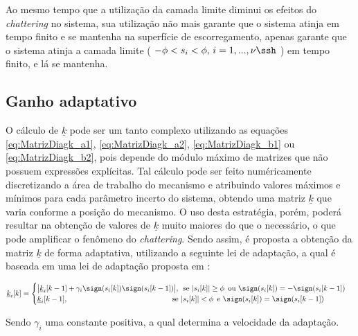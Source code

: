 \documentclass[]{politex}
\begin{document}
Ao mesmo tempo que a utilização da camada limite diminui os efeitos do \emph{chattering} no sistema, sua utilização não mais garante que o sistema atinja em tempo finito e se mantenha na superfície de escorregamento, apenas garante que o sistema atinja a camada limite ( $-\phi < s_i < \phi, \, i = 1,...,\nu\ssh $ ) em tempo finito, e lá se mantenha. 


\subsection{Ganho adaptativo}

O cálculo de $\underline{k}$ pode ser um tanto complexo utilizando as equações \eqref{eq:MatrizDiagk_a1}, \eqref{eq:MatrizDiagk_a2}, \eqref{eq:MatrizDiagk_b1} ou \eqref{eq:MatrizDiagk_b2}, pois depende do módulo máximo de matrizes que não possuem expressões explícitas. Tal cálculo pode ser feito numéricamente discretizando a área de trabalho do mecanismo e atribuindo valores máximos e mínimos para cada parâmetro incerto do sistema, obtendo uma matriz $\underline{k}$ que varia conforme a posição do mecanismo. O uso desta estratégia, porém, poderá resultar na obtenção de valores de $\underline{k}$ muito maiores do que o necessário, o que pode amplificar o fenômeno do \emph{chattering}. Sendo assim, é proposta a obtenção da matriz $\underline{k}$ de forma adaptativa, utilizando a seguinte lei de adaptação, a qual é baseada em uma lei de adaptação proposta em \cite{Monsees}:

\begin{equation}
\underline{k}_i[k] = \begin{cases}
\big| \underline{k}_i[k-1] + \gamma_i \sign(s_i [k]) \sign(s_i [k-1])  \big|, \, \text{ se } |s_i[k]| \geq \phi \, \text{ ou }  \sign(s_i [k]) = - \sign(s_i [k-1]) \\
\underline{k}_i[k-1], \;\;\;\;\;\;\;\;\;\;\;\;\;\;\;\;\;\;\;\;\;\;\;\;\;\;\;\;\;\;\;\;\;\;\;\;\;\;\;\;\;\;\;\;\;\;\;\;\;\, \text{ se } |s_i[k]| < \phi \, \text{ e }  \sign(s_i [k]) = \sign(s_i [k-1]) \\
 
\end{cases}
\end{equation}

Sendo $\gamma_i$ uma constante positiva, a qual determina a velocidade da adaptação. \\
\end{document}
